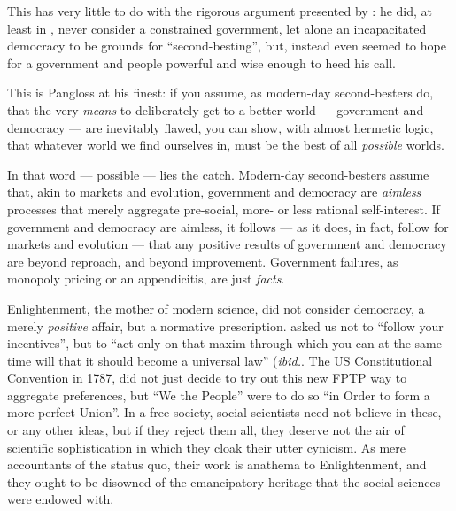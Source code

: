 This has very little to do with the rigorous argument presented by \citeauthor{Lancaster1956}:
he did, at least in \citeyear{Lancaster1956}, never consider a constrained government, let alone an incapacitated democracy to be grounds for ``second-besting'', but, instead even seemed to hope for a government and people powerful and wise enough to heed his call.

This is Pangloss at his finest:
if you assume, as modern-day second-besters do, that the very \emph{means} to deliberately get to a better world --- government and democracy --- are inevitably flawed, you can show, with almost hermetic logic, that whatever world we find ourselves in, must be the best of all \emph{possible} worlds.

In that word --- possible --- lies the catch.
Modern-day second-besters assume that, akin to markets and evolution, government and democracy are \emph{aimless} processes that merely aggregate pre-social, more- or less rational self-interest.
If government and democracy are aimless, it follows --- as it does, in fact, follow for markets and evolution --- that any positive results of government and democracy are beyond reproach, and beyond improvement.
Government failures, as monopoly pricing or an appendicitis, are just \emph{facts}.


Enlightenment, the mother of modern science, did not consider democracy, a merely \emph{positive} affair, but a normative prescription.
\cite{Kant1785} asked us not to ``follow your incentives'', but to ``act only on that maxim through which you can at the same time will that it should become a universal law'' \citeyearpar[Chapter 11]{Kant1785}(\emph{ibid.}.
The US Constitutional Convention in 1787, did not just decide to try out this new \gls{FPTP} way to aggregate preferences, but ``We the People'' were to do so ``in Order to form a more perfect Union''.
In a free society, social scientists need not believe in these, or any other ideas, but if they reject them all, they deserve not the air of scientific sophistication in which they cloak their utter cynicism.
As mere accountants of the status quo, their work is anathema to Enlightenment, and they ought to be disowned of the emancipatory heritage that the social sciences were endowed with.

